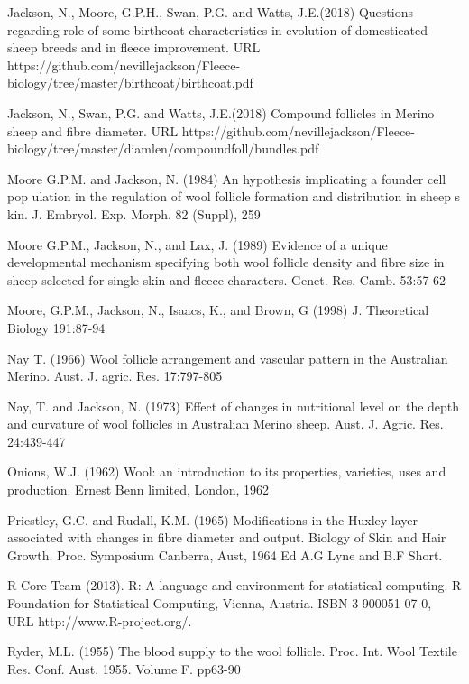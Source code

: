 \documentclass[titlepage]{article}  %
\begin{document}
\begin{thebibliography}{99}
Jackson, N., Moore, G.P.H., Swan, P.G. and Watts, J.E.(2018) Questions regarding role of some birthcoat characteristics in evolution of domesticated sheep breeds and in fleece improvement. URL https://github.com/nevillejackson/Fleece-biology/tree/master/birthcoat/birthcoat.pdf

Jackson, N., Swan, P.G. and Watts, J.E.(2018) Compound follicles in Merino sheep and fibre diameter. URL https://github.com/nevillejackson/Fleece-biology/tree/master/diamlen/compoundfoll/bundles.pdf


Moore G.P.M. and Jackson, N. (1984) An hypothesis implicating a founder cell pop
ulation in the regulation of wool follicle formation and distribution in sheep s
kin. J. Embryol. Exp. Morph. 82 (Suppl), 259

Moore G.P.M., Jackson, N., and Lax, J. (1989) Evidence of a unique developmental mechanism specifying both wool follicle density and fibre size in sheep selected for single skin and fleece characters. Genet. Res. Camb. 53:57-62

Moore, G.P.M., Jackson, N., Isaacs, K., and Brown, G (1998) J. Theoretical Biology 191:87-94

Nay T. (1966) Wool follicle arrangement and vascular pattern in the Australian Merino. Aust. J. agric. Res. 17:797-805

Nay, T. and Jackson, N. (1973) Effect of changes in nutritional level on the depth and curvature of wool follicles in Australian Merino sheep. Aust. J. Agric. Res. 24:439-447

Onions, W.J. (1962) Wool: an introduction to its properties, varieties, uses
     and production. Ernest Benn limited, London, 1962

Priestley, G.C. and Rudall, K.M. (1965) Modifications in the Huxley layer associated with changes in fibre diameter and output. Biology of Skin and Hair Growth. Proc. Symposium Canberra, Aust, 1964 Ed A.G Lyne and B.F Short.

R Core Team (2013). R: A language and environment for statistical
  computing. R Foundation for Statistical Computing, Vienna, Austria.
  ISBN 3-900051-07-0, URL http://www.R-project.org/.

Ryder, M.L. (1955) The blood supply to the wool follicle. Proc. Int. Wool Textile Res. Conf. Aust. 1955. Volume F. pp63-90


\end{thebibliography}
\end{document}
